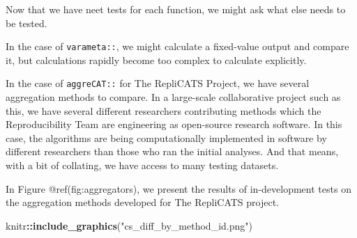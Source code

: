 \documentclass[
]{article}
\newenvironment{Shaded}{\begin{snugshade}}{\end{snugshade}}
\newcommand{\KeywordTok}[1]{\textcolor[rgb]{0.13,0.29,0.53}{\textbf{#1}}}
\newcommand{\NormalTok}[1]{#1}
\newcommand{\OperatorTok}[1]{\textcolor[rgb]{0.81,0.36,0.00}{\textbf{#1}}}
\newcommand{\StringTok}[1]{\textcolor[rgb]{0.31,0.60,0.02}{#1}}
\begin{document}
Now that we have neet tests for each function, we might ask what else
needs to be tested.

In the case of \texttt{varameta::}, we might calculate a fixed-value
output and compare it, but calculations rapidly become too complex to
calculate explicitly.

In the case of \texttt{aggreCAT::} for The RepliCATS Project, we have
several aggregation methods to compare. In a large-scale collaborative
project such as this, we have several different researchers contributing
methods which the Reproducibility Team are engineering as open-source
research software. In this case, the algorithms are being
computationally implemented in software by different researchers than
those who ran the initial analyses. And that means, with a bit of
collating, we have access to many testing datasets.

In Figure @ref(fig:aggregators), we present the results of
in-development tests on the aggregation methods developed for The
RepliCATS project.

\begin{Shaded}
\begin{Highlighting}[]
\NormalTok{knitr}\OperatorTok{::}\KeywordTok{include\_graphics}\NormalTok{(}\StringTok{"cs\_diff\_by\_method\_id.png"}\NormalTok{)}
\end{Highlighting}
\end{Shaded}
\end{document}
